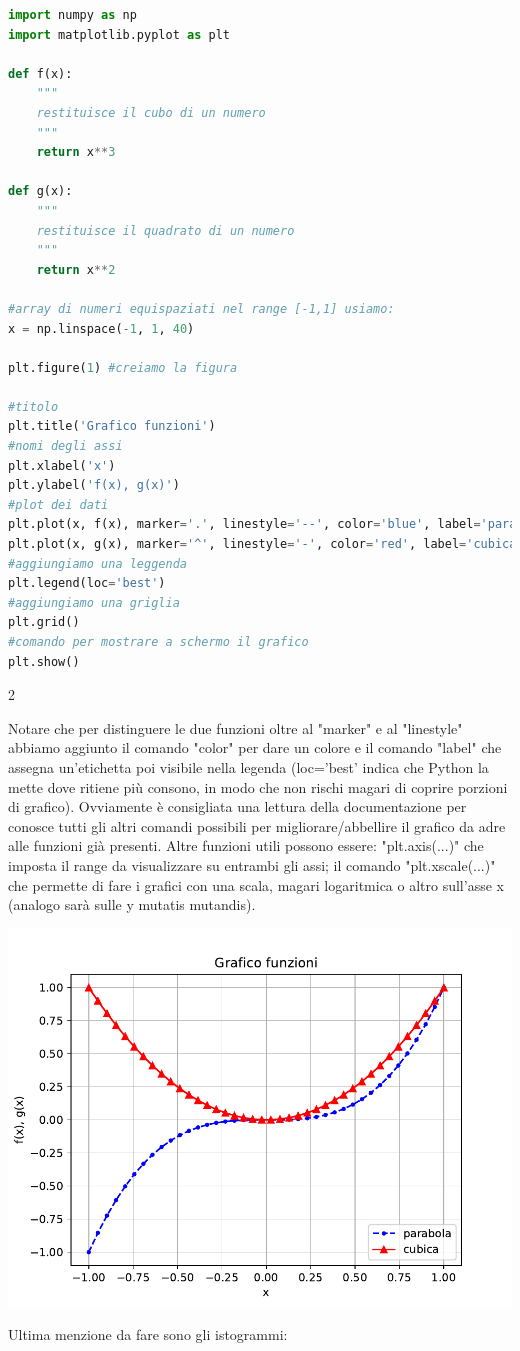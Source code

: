 \documentclass[10pt,a4paper]{article}
\begin{document}
\begin{lstlisting}[language=Python]
import numpy as np
import matplotlib.pyplot as plt

def f(x):
    """
    restituisce il cubo di un numero
    """
    return x**3
    
def g(x):
    """
    restituisce il quadrato di un numero
    """
    return x**2

#array di numeri equispaziati nel range [-1,1] usiamo:
x = np.linspace(-1, 1, 40)

plt.figure(1) #creiamo la figura

#titolo
plt.title('Grafico funzioni')
#nomi degli assi
plt.xlabel('x')
plt.ylabel('f(x), g(x)')
#plot dei dati
plt.plot(x, f(x), marker='.', linestyle='--', color='blue', label='parabola')
plt.plot(x, g(x), marker='^', linestyle='-', color='red', label='cubica')
#aggiungiamo una leggenda
plt.legend(loc='best')
#aggiungiamo una griglia
plt.grid()
#comando per mostrare a schermo il grafico
plt.show()
\end{lstlisting}
\begin{multicols}{2}

Notare che per distinguere le due funzioni oltre al "marker" e al "linestyle" abbiamo aggiunto il comando "color" per dare un colore e il comando "label" che assegna un'etichetta poi visibile nella legenda (loc='best' indica che Python la mette dove ritiene più consono, in modo che non rischi magari di coprire porzioni di grafico). Ovviamente è consigliata una lettura della documentazione per conosce tutti gli altri comandi possibili per migliorare/abbellire il grafico da adre alle funzioni già presenti. Altre funzioni utili possono essere: "plt.axis(...)" che imposta il range da visualizzare su entrambi gli assi; il comando "plt.xscale(...)" che permette di fare i grafici con una scala, magari logaritmica o altro sull'asse x (analogo sarà sulle y mutatis mutandis). 


\includegraphics[scale=0.5]{img/grafico2.pdf}

\end{multicols}
Ultima menzione da fare sono gli istogrammi:
\end{document}

